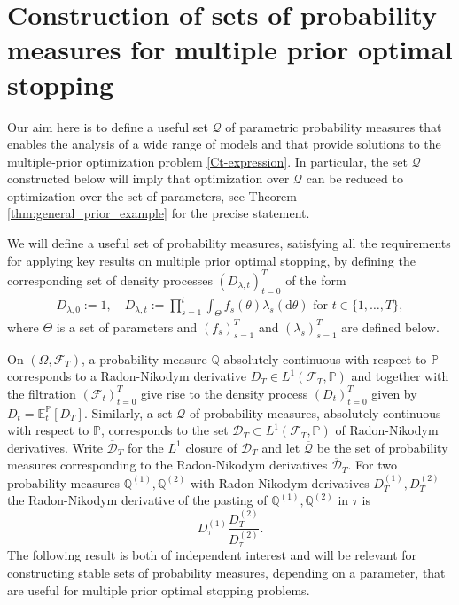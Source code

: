 \documentclass[11pt,a4paper]{article}
\newcommand{\E}{\mathbb{E}}
\renewcommand{\P}{\mathbb{P}}
\newcommand{\Q}{\mathbb{Q}}
\newcommand{\calF}{\mathcal{F}}
\newcommand{\calQ}{\mathcal{Q}}
\newcommand{\calD}{\mathcal{D}}
\begin{document}
\section{Construction of sets of probability measures for multiple prior optimal stopping}\label{sec:Q}

Our aim here is to define a useful set $\calQ$ of parametric probability measures that enables the analysis of a wide range of models and that provide solutions to the multiple-prior optimization problem \eqref{Ct-expression}. In particular, the set $\calQ$ constructed below will imply that optimization over $\calQ$ can be reduced to optimization over the set of parameters, see Theorem \ref{thm:general_prior_example} for the precise statement. 

We will define a useful set of probability measures, satisfying all the requirements for applying key results on multiple prior optimal stopping, by defining the corresponding set of density processes $(D_{\lambda,t})_{t=0}^T$ of the form 
\begin{align*}
D_{\lambda,0}:=1, \quad 
D_{\lambda,t}:=\prod_{s=1}^t \int_\Theta f_s(\theta) \lambda_s(\mathrm{d}\theta) \text{ for }
t\in\{1,\dots,T\},
\end{align*}
where $\Theta$ is a set of parameters and $(f_s)_{s=1}^T$ and $(\lambda_s)_{s=1}^T$ are defined below. 

On $(\Omega,\calF_T)$, a probability measure $\Q$ absolutely continuous with respect to $\P$ corresponds to a Radon-Nikodym derivative $D_T\in L^1(\calF_T,\P)$ and together with the filtration $(\calF_t)_{t=0}^T$ give rise to the density process $(D_t)_{t=0}^T$ given by $D_t=\E^{\P}_t[D_T]$.   
Similarly, a set $\calQ$ of probability measures, absolutely continuous with respect to $\P$, corresponds to the set $\calD_T\subset L^1(\calF_T,\P)$ of Radon-Nikodym derivatives. 
Write $\overline{\calD}_T$ for the $L^1$ closure of $\calD_T$ and let $\overline{\calQ}$ be the set of probability measures corresponding to the Radon-Nikodym derivatives $\overline{\calD}_T$. For two probability measures $\Q^{(1)},\Q^{(2)}$ with Radon-Nikodym derivatives $D^{(1)}_T,D^{(2)}_T$ the Radon-Nikodym derivative of the pasting of $\Q^{(1)},\Q^{(2)}$ in $\tau$ is 
$$
D^{(1)}_{\tau}\frac{D^{(2)}_T}{D^{(2)}_{\tau}}.
$$
The following result is both of independent interest and will be relevant for constructing stable sets of probability measures, depending on a parameter, that are useful for multiple prior optimal stopping problems. 
\end{document}
